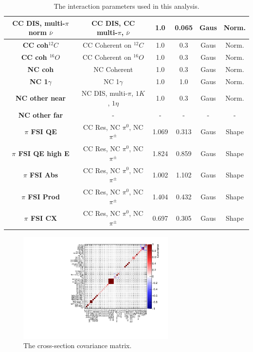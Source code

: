 \begin{center}
\begin{table}
\begin{adjustwidth}{-.9in}{-.9in}
{\begin{tabular}{ c||c|c|c|c|c}
\hline
\textbf{CC DIS, multi-$\pi$ norm $\bar{\nu}$} & CC DIS, CC multi-$\pi$, $\bar{\nu}$ & 1.0 & 0.065 & Gaus & Norm.\\
\hline
\textbf{CC coh$^{12}C$} & CC Coherent on $^{12}C$ & 1.0 & 0.3 & Gaus & Norm.\\
\hline
\textbf{CC coh $^{16}O$} & CC Coherent on $^{16}O$& 1.0 & 0.3 &  Gaus & Norm.\\
\hline
\textbf{NC coh} & NC Coherent & 1.0 & 0.3 & Gaus & Norm.\\
\hline
\textbf{NC 1$\gamma$} & NC 1$\gamma$ & 1.0 & 1.0 & Gaus & Norm.\\
\hline
\textbf{NC other near} & NC DIS, multi-$\pi$, $1K$, $1\eta$ & 1.0 & 0.3 & Gaus & Norm.\\
\hline
\textbf{NC other far} & - & - & - & - & -\\
\hline
\textbf{$\pi$ FSI QE} & CC Res, NC $\pi^{0}$, NC $\pi^{\pm}$ & 1.069 & 0.313 & Gaus & Shape\\
\hline
\textbf{$\pi$ FSI QE high E} & CC Res, NC $\pi^{0}$, NC $\pi^{\pm}$ & 1.824 & 0.859 & Gaus & Shape\\
\hline
\textbf{$\pi$ FSI Abs} &  CC Res, NC $\pi^{0}$, NC $\pi^{\pm}$ & 1.002 & 1.102 & Gaus & Shape\\
\hline
\textbf{$\pi$ FSI Prod} & CC Res, NC $\pi^{0}$, NC $\pi^{\pm}$ & 1.404 & 0.432 & Gaus & Shape\\
\hline
\textbf{$\pi$ FSI CX} &  CC Res, NC $\pi^{0}$, NC $\pi^{\pm}$ & 0.697 & 0.305 & Gaus & Shape\\
\hline
\hline
\end{tabular}}
\caption{The interaction parameters used in this analysis.}\label{tab:xsecparams}
\end{adjustwidth}
\end{table}
\end{center}

\begin{figure}[!htbp]
\centering
\includegraphics*[width=0.7\textwidth,clip]{figs/xseccov}
\caption{The cross-section covariance matrix.}\label{fig:xseccov}
\end{figure}

